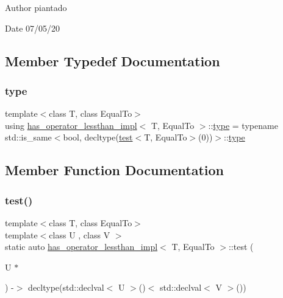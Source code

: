 \begin{DoxyAuthor}{Author}
piantado 
\end{DoxyAuthor}
\begin{DoxyDate}{Date}
07/05/20 
\end{DoxyDate}


\subsection{Member Typedef Documentation}
\mbox{\label{structhas__operator__lessthan__impl_a94158125949ce4db0eefedbdc4cbad73}} 
\subsubsection{\texorpdfstring{type}{type}}
{\footnotesize\ttfamily template$<$class T, class Equal\+To$>$ \\
using \hyperlink{structhas__operator__lessthan__impl}{has\+\_\+operator\+\_\+lessthan\+\_\+impl}$<$ T, Equal\+To $>$\+::\hyperlink{structhas__operator__lessthan__impl_a94158125949ce4db0eefedbdc4cbad73}{type} =  typename std\+::is\+\_\+same$<$bool, decltype(\hyperlink{structhas__operator__lessthan__impl_a5eee8607153dcb4ac5ed91df37251062}{test}$<$T, Equal\+To$>$(0))$>$\+::\hyperlink{structhas__operator__lessthan__impl_a94158125949ce4db0eefedbdc4cbad73}{type}}



\subsection{Member Function Documentation}
\mbox{\label{structhas__operator__lessthan__impl_a5eee8607153dcb4ac5ed91df37251062}} 
\subsubsection{\texorpdfstring{test()}{test()}\hspace{0.1cm}{\footnotesize\ttfamily [1/2]}}
{\footnotesize\ttfamily template$<$class T, class Equal\+To$>$ \\
template$<$class U , class V $>$ \\
static auto \hyperlink{structhas__operator__lessthan__impl}{has\+\_\+operator\+\_\+lessthan\+\_\+impl}$<$ T, Equal\+To $>$\+::test (\begin{DoxyParamCaption}\item[{U $\ast$}]{ }\end{DoxyParamCaption}) -\/$>$  decltype(std\+::declval$<$ U $>$()$<$ std\+::declval$<$ V $>$())\hspace{0.3cm}{\ttfamily [static]}}

